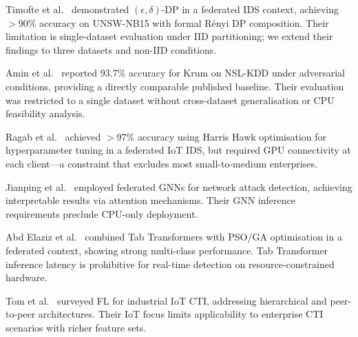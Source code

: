 \documentclass[conference]{IEEEtran}
\begin{document}
Timofte et al.~\cite{timofte2025} demonstrated $(\epsilon,\delta)$-DP
in a federated IDS context, achieving $>$90\% accuracy on UNSW-NB15
with formal R\'{e}nyi DP composition.
Their limitation is single-dataset evaluation under IID partitioning;
we extend their findings to three datasets and non-IID conditions.

Amin et al.~\cite{amin2025} reported 93.7\% accuracy for Krum on
NSL-KDD under adversarial conditions, providing a directly comparable
published baseline.
Their evaluation was restricted to a single dataset without
cross-dataset generalisation or CPU feasibility analysis.

Ragab et al.~\cite{ragab2025} achieved $>$97\% accuracy using
Harris Hawk optimisation for hyperparameter tuning in a federated
IoT IDS, but required GPU connectivity at each client---a constraint
that excludes most small-to-medium enterprises.

Jianping et al.~\cite{jianping2024} employed federated GNNs for
network attack detection, achieving interpretable results via attention
mechanisms.
Their GNN inference requirements preclude CPU-only deployment.

Abd Elaziz et al.~\cite{abdelaziz2025} combined Tab Transformers with
PSO/GA optimisation in a federated context, showing strong multi-class
performance.
Tab Transformer inference latency is prohibitive for real-time
detection on resource-constrained hardware.

Tom et al.~\cite{tom2025} surveyed FL for industrial IoT CTI,
addressing hierarchical and peer-to-peer architectures.
Their IoT focus limits applicability to enterprise CTI scenarios with
richer feature sets.
\end{document}
